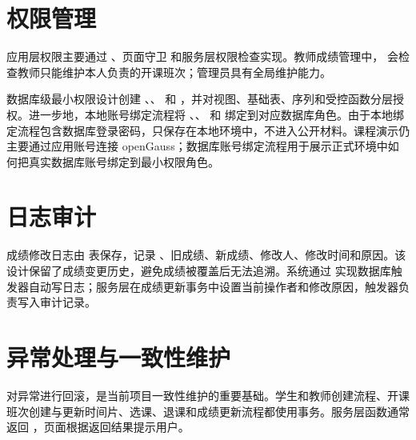 \section{权限管理}

应用层权限主要通过 、页面守卫  和服务层权限检查实现。教师成绩管理中， 会检查教师只能维护本人负责的开课班次；管理员具有全局维护能力。

数据库级最小权限设计创建 、、 和 ，并对视图、基础表、序列和受控函数分层授权。进一步地，本地账号绑定流程将 、、 和  绑定到对应数据库角色。由于本地绑定流程包含数据库登录密码，只保存在本地环境中，不进入公开材料。课程演示仍主要通过应用账号连接 openGauss；数据库账号绑定流程用于展示正式环境中如何把真实数据库账号绑定到最小权限角色。



\section{日志审计}

成绩修改日志由  表保存，记录 、旧成绩、新成绩、修改人、修改时间和原因。该设计保留了成绩变更历史，避免成绩被覆盖后无法追溯。系统通过  实现数据库触发器自动写日志；服务层在成绩更新事务中设置当前操作者和修改原因，触发器负责写入审计记录。

\section{异常处理与一致性维护}

 对异常进行回滚，是当前项目一致性维护的重要基础。学生和教师创建流程、开课班次创建与更新时间片、选课、退课和成绩更新流程都使用事务。服务层函数通常返回 ，页面根据返回结果提示用户。

